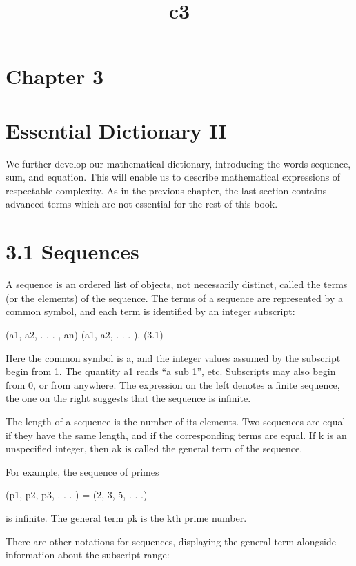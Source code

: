 \documentclass[11pt]{article}
\title{c3}
\date{}
\theoremstyle{plain}
\theoremstyle{definition}
\begin{document}
\maketitle

\section{Chapter 3}

\section{Essential Dictionary II}

We further develop our mathematical dictionary, introducing the words sequence, sum, and equation. This will enable us to describe mathematical expressions of respectable complexity. As in the previous chapter, the last section contains advanced terms which are not essential for the rest of this book.

\section{3.1 Sequences}

A sequence is an ordered list of objects, not necessarily distinct, called the terms (or the elements) of the sequence. The terms of a sequence are represented by a common symbol, and each term is identified by an integer subscript:

(a1, a2, . . . , an) (a1, a2, . . . ). (3.1)

Here the common symbol is a, and the integer values assumed by the subscript begin from 1. The quantity a1 reads ``a sub 1'', etc. Subscripts may also begin from 0, or from anywhere. The expression on the left denotes a finite sequence, the one on the right suggests that the sequence is infinite.

The length of a sequence is the number of its elements. Two sequences are equal if they have the same length, and if the corresponding terms are equal. If k is an unspecified integer, then ak is called the general term of the sequence.

For example, the sequence of primes

(p1, p2, p3, . . . ) = (2, 3, 5, . . .)

is infinite. The general term pk is the kth prime number.

There are other notations for sequences, displaying the general term alongside information about the subscript range:
\end{document}
